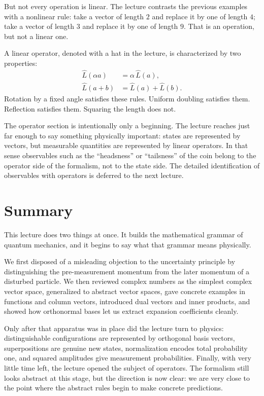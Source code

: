 But not every operation is linear. The lecture contrasts the previous examples with a nonlinear rule: take a vector of length \(2\) and replace it by one of length \(4\); take a vector of length \(3\) and replace it by one of length \(9\). That is an operation, but not a linear one.

A linear operator, denoted with a hat in the lecture, is characterized by two properties:
\begin{align}
\hat L(\alpha a) &= \alpha\,\hat L(a),\\
\hat L(a+b) &= \hat L(a) + \hat L(b).
\end{align}
Rotation by a fixed angle satisfies these rules. Uniform doubling satisfies them. Reflection satisfies them. Squaring the length does not.

The operator section is intentionally only a beginning. The lecture reaches just far enough to say something physically important: states are represented by vectors, but measurable quantities are represented by linear operators. In that sense observables such as the ``headsness'' or ``tailsness'' of the coin belong to the operator side of the formalism, not to the state side. The detailed identification of observables with operators is deferred to the next lecture.

\section{Summary}

This lecture does two things at once. It builds the mathematical grammar of quantum mechanics, and it begins to say what that grammar means physically.

We first disposed of a misleading objection to the uncertainty principle by distinguishing the pre-measurement momentum from the later momentum of a disturbed particle. We then reviewed complex numbers as the simplest complex vector space, generalized to abstract vector spaces, gave concrete examples in functions and column vectors, introduced dual vectors and inner products, and showed how orthonormal bases let us extract expansion coefficients cleanly.

Only after that apparatus was in place did the lecture turn to physics: distinguishable configurations are represented by orthogonal basis vectors, superpositions are genuine new states, normalization encodes total probability one, and squared amplitudes give measurement probabilities. Finally, with very little time left, the lecture opened the subject of operators. The formalism still looks abstract at this stage, but the direction is now clear: we are very close to the point where the abstract rules begin to make concrete predictions.
